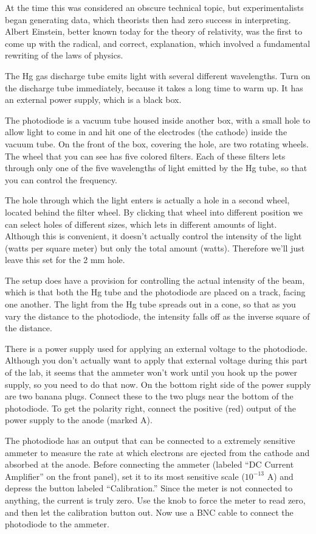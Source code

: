 At the time this was considered an obscure technical topic, but experimentalists
began generating data, which theorists then had zero success in interpreting.
Albert Einstein,
better known today for the theory of relativity, was the
first to come up with the radical, and correct, explanation,
which involved a fundamental rewriting of the laws of physics.

\setup

The Hg gas discharge tube emits
light with several different wavelengths.
Turn on the discharge tube immediately, because it takes a long time to warm up.
It has an external power supply, which is a black box.

The photodiode is a vacuum tube housed inside another box, with a small hole
to allow light to come in and hit one of the electrodes (the cathode) inside the vacuum tube.
On the front of the box, covering the hole, are two rotating wheels.  The wheel
that you can see has five colored filters. Each of these filters lets through only
one of the five wavelengths of light emitted by the Hg tube, so that you can control
the frequency.

The hole through which the light enters is actually
a hole in a second wheel, located behind the filter wheel. By clicking that wheel into different position we can
select holes of different sizes, which lets in different amounts of light.
Although this is convenient, it doesn't actually control the intensity of the light (watts per square meter)
but only the total amount (watts). Therefore we'll just leave this set for the 2 mm hole.

The setup does have a provision for controlling the actual intensity of the beam, which is that both
the Hg tube and the photodiode are placed on a track, facing one another.  The light from the Hg tube
spreads out in a cone, so that as you vary the distance to the photodiode, the intensity falls off as
the inverse square of the distance.

There is a power supply used for applying an external voltage to the photodiode. Although you don't
actually want to apply that external voltage during this part of the lab, it seems that the ammeter
won't work until you hook up the power supply, so you need to do that now.
On the bottom right side of the power supply are two banana plugs. Connect these to the
two plugs near the bottom of the photodiode. To get the polarity right, connect the 
positive (red) output of the power supply to the anode (marked A).

The photodiode has an output that can be connected to a extremely sensitive ammeter to measure the
rate at which electrons are ejected from the cathode and absorbed at the anode. Before connecting the
ammeter (labeled ``DC Current Amplifier'' on the front panel), set it to its most sensitive scale
($10^{-13}$ A) and depress the button labeled ``Calibration.'' Since the meter is not connected to anything,
the current is truly zero. Use the knob to force the meter to read zero, and then let the calibration button out.
Now use a BNC cable to connect the photodiode to the ammeter.

